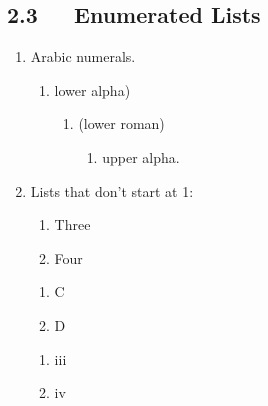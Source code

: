 \documentclass[a4paper]{article}
\newcounter{enumv}
\begin{document}
\subsection{2.3   Enumerated Lists%
  \label{enumerated-lists}%
}

\begin{enumerate}
\item Arabic numerals.

\begin{enumerate}
\renewcommand{\labelenumii}{\alph{enumii})}
\item lower alpha)

\begin{enumerate}
\renewcommand{\labelenumiii}{(\roman{enumiii})}
\item (lower roman)

\begin{enumerate}
\item upper alpha.

\end{enumerate}
\end{enumerate}
\end{enumerate}

\item Lists that don’t start at 1:

\begin{enumerate}
\renewcommand{\labelenumii}{\arabic{enumii}.}
\setcounter{enumii}{2}
\item Three

\item Four
\end{enumerate}

\begin{enumerate}
\renewcommand{\labelenumii}{\Alph{enumii}.}
\setcounter{enumii}{2}
\item C

\item D
\end{enumerate}

\begin{enumerate}
\renewcommand{\labelenumii}{\roman{enumii}.}
\setcounter{enumii}{2}
\item iii

\item iv
\end{enumerate}
\end{enumerate}
\end{document}
